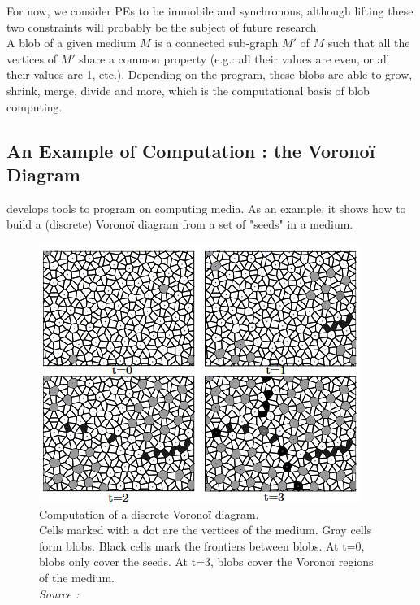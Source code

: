 \documentclass{article}
\begin{document}
For now, we consider PEs to be immobile and synchronous, although lifting these two constraints will probably be the subject of future research.\\

A blob of a given medium $M$ is a connected sub-graph $M'$ of $M$ such that all the vertices of $M'$ share a common property (e.g.: all their values are even, or all their values are 1, etc.). Depending on the program, these blobs are able to grow, shrink, merge, divide and more, which is the computational basis of blob computing\supercite{blob_computing2}.

\subsection{An Example of Computation : the Voronoï Diagram}

\cite{Voronoi} develops tools to program on computing media. As an example, it shows how to build a (discrete) Voronoï diagram from a set of "seeds" in a medium.

\begin{figure}[H]
	\centering\includegraphics[width=0.7\linewidth]{assets/voronoi_spread.png}
	\caption{
		Computation of a discrete Voronoï diagram.\\
		Cells marked with a dot are the vertices of the medium.
		Gray cells form blobs. Black cells mark the frontiers between blobs. At t=0, blobs only cover the seeds. At t=3, blobs cover the Voronoï regions of the medium.\\
		\textit{Source : \cite{Voronoi}}
	}
	\label{fig:voronoi_spread}
\end{figure}
\end{document}
